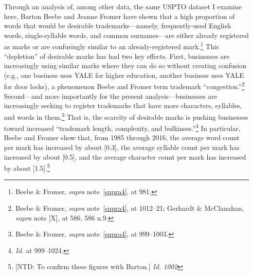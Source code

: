 \documentclass[letterpaper, 11pt, oneside]{article}
\begin{document}
Through an analysis of, among other data, the same USPTO dataset I examine here, Barton Beebe and Jeanne Fromer have shown that a high proportion of words that would be desirable trademarks—namely, frequently-used English words, single-syllable words, and common surnames—are either already registered as marks or are confusingly similar to an already-registered mark.\footnote{Beebe \& Fromer, \textit{supra} note~\ref{supra4}, at 981.} This ``depletion'' of desirable marks has had two key effects. First, businesses are increasingly using similar marks where they can do so without creating confusion (e.g., one business uses YALE for higher education, another business uses YALE for door locks), a phenomenon Beebe and Fromer term trademark ``congestion.''\footnote{Beebe \& Fromer, \textit{supra} note~\ref{supra4}, at 1012–21; Gerhardt \& McClanahan, \textit{supra} note [X], at 586, 586 n.9.} Second—and more importantly for the present analysis—businesses are increasingly seeking to register trademarks that have more characters, syllables, and words in them.\footnote{Beebe \& Fromer, \textit{supra} note~\ref{supra4}, at 999–1003.} That is, the scarcity of desirable marks is pushing businesses toward increased ``trademark length, complexity, and bulkiness.''\footnote{\textit{Id.} at 999–1024.}  In particular, Beebe and Fromer show that, from 1985 through 2016, the average word count per mark has increased by about [0.3], the average syllable count per mark has increased by about [0.5], and the average character count per mark has increased by about [1.5].\footnote{[NTD: To confirm these figures with Barton.] \textit{Id. 1002}}
\end{document}
